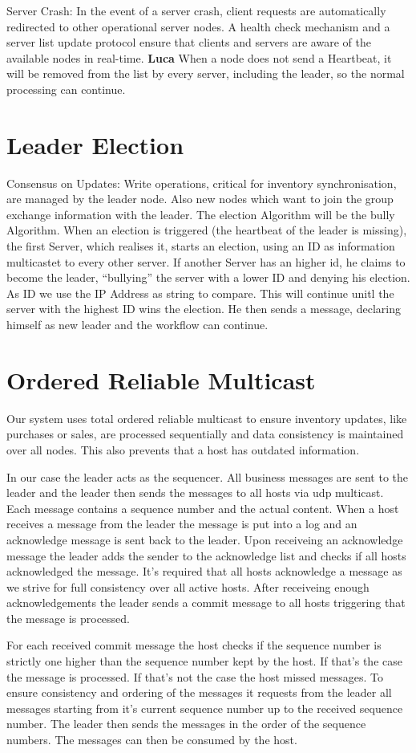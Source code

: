 Server Crash: In the event of a server crash, client requests are automatically redirected to other operational server nodes. A health check mechanism and a server list update protocol ensure that clients and servers are aware of the available nodes in real-time. \textbf{Luca} When a node does not send a Heartbeat,
it will be removed from the list by every server, including the leader, so the normal processing can continue.


\section{Leader Election}\label{sec:Election}
Consensus on Updates: Write operations, critical for inventory synchronisation, are managed by the leader node. Also new nodes which want to join the group exchange information with the leader. The election Algorithm will be the bully Algorithm.
When an election is triggered (the heartbeat of the leader is missing), the first Server, which realises it, starts an election, using an ID as information multicastet to every other server. If another Server has an higher id, he claims to become the leader,
\enquote{bullying} the server with a lower ID and denying his election. As ID we use the IP Address as string to compare. This will continue unitl the server with the highest ID wins the election. He then sends a message, declaring himself as new leader and the workflow can continue.

\section{Ordered Reliable Multicast}\label{sec:OrderedReliableMulticast}
Our system uses total ordered reliable multicast to ensure inventory updates, like purchases or sales, are processed sequentially and data consistency is maintained over all nodes. This also prevents that a host has outdated information. 

In our case the leader acts as the sequencer. All business messages are sent to the leader and the leader then sends the messages to all hosts via udp multicast. Each message contains a sequence number and the actual content. When a host receives a message from the leader the message is put into a log and an acknowledge message is sent back to the leader. Upon receiveing an acknowledge message the leader adds the sender to the acknowledge list and checks if all hosts acknowledged the message. It's required that all hosts acknowledge a message as we strive for full consistency over all active hosts. After receiveing enough acknowledgements the leader sends a commit message to all hosts triggering that the message is processed. 

For each received commit message the host checks if the sequence number is strictly one higher than the sequence number kept by the host. 
If that's the case the message is processed.
If that's not the case the host missed messages. To ensure consistency and ordering of the messages it requests from the leader all messages starting from it's current sequence number up to the received sequence number. The leader then sends the messages in the order of the sequence numbers. The messages can then be consumed by the host. 
